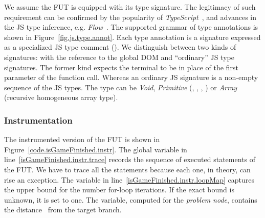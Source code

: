 We assume the FUT is equipped with its type signature. The legitimacy of such requirement can be confirmed by the popularity of \emph{TypeScript}~\cite{typescript}, and advances in the JS type inference, e.g. \emph{Flow}~\cite{flow}. The supported grammar of type annotations is shown in Figure~\ref{fig.js.type.annot}. Each type annotation is a signature expressed as a specialized JS type comment (). We distinguish between two kinds of signatures: with the reference to the global DOM and ``ordinary'' JS type signatures. The former kind expects the  terminal to be in place of the first parameter of the function call. Whereas an ordinary JS signature is a non-empty sequence of the JS types. The type can be \emph{Void}, \emph{Primitive} (, , , ) or \emph{Array} (recursive homogeneous array type).


\subsubsection{Instrumentation}
\label{sub.sec.instrument}

The instrumented version of the FUT is shown in Figure~\ref{code.isGameFinished.instr}. The global variable  in line~\ref{isGameFinished.instr.trace} records the sequence of executed statements of the FUT. We have to trace all the statements because each one, in theory, can rise an exception. The  variable in line~\ref{isGameFinished.instr.loopMap} captures the upper bound for the number for-loop iterations. If the exact bound is unknown, it is set to one. The  variable, computed for the \emph{problem node}, contains the distance~\cite{tracey1998automated} from the target branch.


